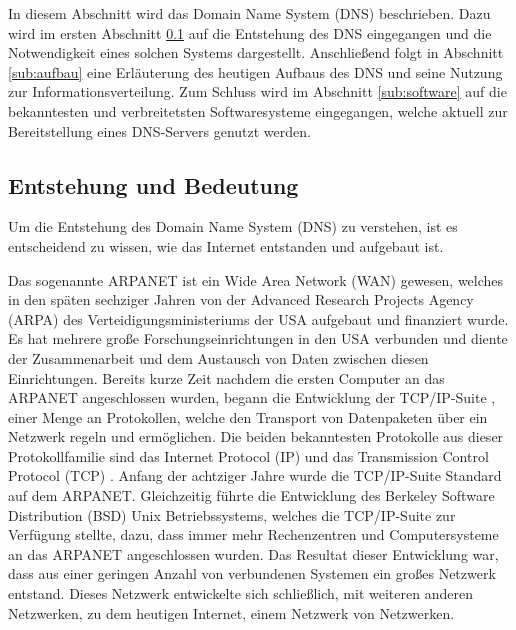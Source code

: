 \documentclass[a4paper, 12pt, BCOR10mm, DIV12, toc=bibliography, toc=listof, german]{scrbook}
\def \dns {Domain Name System (DNS)}
\begin{document}
		In diesem Abschnitt wird das \dns{} \cite{rfc1034,rfc1035} beschrieben. Dazu wird im ersten
		Abschnitt \ref{sub:entstehung} auf die Entstehung des DNS eingegangen und die Notwendigkeit
		eines solchen Systems dargestellt.  Anschließend folgt in Abschnitt \ref{sub:aufbau} eine
		Erläuterung des heutigen Aufbaus des DNS und seine Nutzung zur Informationsverteilung.
		Zum Schluss wird im Abschnitt \ref{sub:software} auf die bekanntesten und verbreitetsten
		Softwaresysteme eingegangen, welche aktuell zur Bereitstellung eines DNS-Servers genutzt werden.

			\subsection{Entstehung und Bedeutung} %
			\label{sub:entstehung}

			Um die Entstehung des \dns{} zu verstehen, ist es entscheidend zu wissen, wie das Internet
			entstanden und aufgebaut ist.
			
			Das sogenannte ARPANET ist ein Wide Area Network (WAN) gewesen, welches in den späten
			sechziger Jahren von der Advanced Research Projects Agency (ARPA) des
			Verteidigungsministeriums der USA aufgebaut und finanziert wurde. Es hat mehrere große
			Forschungseinrichtungen in den USA verbunden und diente der Zusammenarbeit und dem Austausch
			von Daten zwischen diesen Einrichtungen. Bereits kurze Zeit nachdem die ersten Computer an
			das ARPANET angeschlossen wurden, begann die Entwicklung der TCP/IP-Suite \cite{stevens1994},
			einer Menge an Protokollen, welche den Transport von Datenpaketen über ein Netzwerk regeln
			und ermöglichen.  Die beiden bekanntesten Protokolle aus dieser Protokollfamilie sind das
			Internet Protocol (IP) \cite{rfc791} und das Transmission Control Protocol (TCP)
			\cite{rfc793}. Anfang der achtziger Jahre wurde die TCP/IP-Suite Standard auf dem ARPANET.
			Gleichzeitig führte die Entwicklung des Berkeley Software Distribution (BSD) Unix
			Betriebssystems, welches die TCP/IP-Suite zur Verfügung stellte, dazu, dass immer mehr
			Rechenzentren und Computersysteme an das ARPANET angeschlossen wurden. Das Resultat dieser Entwicklung
			war, dass aus einer geringen Anzahl von verbundenen Systemen ein großes Netzwerk
			entstand. Dieses Netzwerk entwickelte sich schließlich, mit weiteren anderen Netzwerken, zu
			dem heutigen Internet, einem Netzwerk von Netzwerken.
\end{document}

